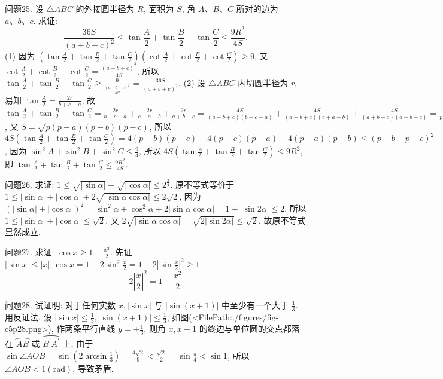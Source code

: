 问题25. 设 $\triangle A B C$ 的外接圆半径为 $R$, 面积为 $S$, 角 $A 、 B 、 C$ 所对的边为 $a 、 b 、 c$.
求证:
$$
\frac{36 S}{(a+b+c)^2} \leqslant \tan \frac{A}{2}+\tan \frac{B}{2}+\tan \frac{C}{2} \leqslant \frac{9 R^2}{4 S} .
$$
(1) 因为 $\left(\tan \frac{A}{2}+\tan \frac{B}{2}+\tan \frac{C}{2}\right)\left(\cot \frac{A}{2}+\cot \frac{B}{2}+\cot \frac{C}{2}\right) \geqslant 9$, 又 $\cot \frac{A}{2}+\cot \frac{B}{2}+\cot \frac{C}{2}=\frac{(a+b+c)^2}{4 S}$, 所以 $\tan \frac{A}{2}+\tan \frac{B}{2}+\tan \frac{C}{2} \geqslant \frac{9}{\frac{(a+b+c)^2}{4 S}}=\frac{36 S}{(a+b+c)^2}$. (2) 设 $\triangle A B C$ 内切圆半径为 $r$, 易知 $\tan \frac{A}{2}= \frac{2 r}{b+c-a}$, 故 $\tan \frac{A}{2}+\tan \frac{B}{2}+\tan \frac{C}{2}=\frac{2 r}{b+c-a}+\frac{2 r}{c+a-b}+\frac{2 r}{a+b-c}= \frac{4 S}{(a+b+c)(b+c-a)}+\frac{4 S}{(a+b+c)(c+a-b)}+\frac{4 S}{(a+b+c)(a+b-c)} =\frac{S}{p(p-a)}+\frac{S}{p(p-b)}+\frac{S}{p(p-c)}\left(p=\frac{a+b+c}{2}\right)$, 又 $S= \sqrt{p(p-a)(p-b)(p-c)}$, 所以 $4 S\left(\tan \frac{A}{2}+\tan \frac{B}{2}+\tan \frac{C}{2}\right)=4(p-b) (p-c)+4(p-c)(p-a)+4(p-a)(p-b) \leqslant(p-b+p-c)^2+(p-c+ p-a)^2+(p-a+p-b)^2=a^2+b^2+c^2=4 R^2\left(\sin ^2 A+\sin ^2 B+\sin ^2 C\right)$, 因为 $\sin ^2 A+\sin ^2 B+\sin ^2 C \leqslant \frac{9}{4}$, 所以 $4 S\left(\tan \frac{A}{2}+\tan \frac{B}{2}+\tan \frac{C}{2}\right) \leqslant 9 R^2$, 即 $\tan \frac{A}{2}+\tan \frac{B}{2}+\tan \frac{C}{2} \leqslant \frac{9 R^2}{4 S}$.



问题26. 求证: $1 \leqslant \sqrt{|\sin \alpha|}+\sqrt{|\cos \alpha|} \leqslant 2^{\frac{3}{4}}$.
原不等式等价于 $1 \leqslant|\sin \alpha|+|\cos \alpha|+2 \sqrt{|\sin \alpha \cos \alpha|} \leqslant 2 \sqrt{2}$, 因为 $(|\sin \alpha|+|\cos \alpha|)^2=\sin ^2 \alpha+\cos ^2 \alpha+2|\sin \alpha \cos \alpha|=1+|\sin 2 \alpha| \leqslant 2$, 所以 $1 \leqslant|\sin \alpha|+|\cos \alpha| \leqslant \sqrt{2}$, 又 $2 \sqrt{|\sin \alpha \cos \alpha|}=\sqrt{2|\sin 2 \alpha|} \leqslant \sqrt{2}$, 故原不等式显然成立.



问题27. 求证: $\cos x \geqslant 1-\frac{x^2}{2}$.
先证 $|\sin x| \leqslant|x|, \cos x=1-2 \sin ^2 \frac{x}{2}=1-2\left|\sin \frac{x}{2}\right|^2 \geqslant 1-$
$$
2\left|\frac{x}{2}\right|^2=1-\frac{x^2}{2}
$$



问题28. 试证明: 对于任何实数 $x,|\sin x|$ 与 $|\sin (x+1)|$ 中至少有一个大于 $\frac{1}{3}$.
用反证法.
设 $|\sin x| \leqslant \frac{1}{3},|\sin (x+1)| \leqslant \frac{1}{3}$, 如图(<FilePath:./figures/fig-c5p28.png>), 作两条平行直线 $y= \pm \frac{1}{3}$, 则角 $x, x+1$ 的终边与单位圆的交点都落在 $\overparen{A B}$ 或 $\overparen{B^{\prime} A^{\prime}}$ 上, 由于 $\sin \angle A O B=\sin \left(2 \arcsin \frac{1}{3}\right)=\frac{4 \sqrt{2}}{9}<\frac{\sqrt{2}}{2}= \sin \frac{\pi}{4}<\sin 1$, 所以 $\angle A O B<1(\mathrm{rad})$, 导致矛盾.



